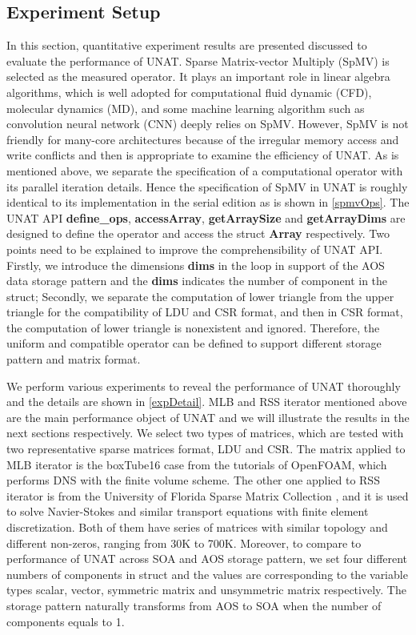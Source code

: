 \documentclass[conference]{IEEEtran}
\begin{document}
\subsection{Experiment Setup}
In this section, quantitative experiment results are presented discussed to evaluate the performance of UNAT. Sparse Matrix-vector Multiply (SpMV) is selected as the measured operator. It plays an important role in linear algebra algorithms, which is well adopted for computational fluid dynamic (CFD), molecular dynamics (MD), and some machine learning algorithm such as convolution neural network (CNN) deeply relies on SpMV. However, SpMV is not friendly for many-core architectures because of the irregular memory access and write conflicts \cite{b8} and then is appropriate to examine the efficiency of UNAT. As is mentioned above, we separate the specification of a computational operator with its parallel iteration details. Hence the specification of SpMV in UNAT is roughly identical to its implementation in the serial edition as is shown in \ref{spmvOps}. The UNAT API \textbf{define\_ops}, \textbf{accessArray}, \textbf{getArraySize} and \textbf{getArrayDims} are designed to define the operator and access the struct \textbf{Array} respectively. Two points need to be explained to improve the comprehensibility of UNAT API. Firstly, we introduce the dimensions \textbf{dims} in the loop in support of the AOS data storage pattern and the \textbf{dims} indicates the number of component in the struct; Secondly, we separate the computation of lower triangle from the upper triangle for the compatibility of LDU and CSR format, and then in CSR format, the computation of lower triangle is nonexistent and ignored. Therefore, the uniform and compatible operator can be defined to support different storage pattern and matrix format.

We perform various experiments to reveal the performance of UNAT thoroughly and the details are shown in \ref{expDetail}. MLB and RSS iterator mentioned above are the main performance object of UNAT and we will illustrate the results in the next sections respectively. We select two types of matrices, which are tested with two representative sparse matrices format, LDU and CSR. The matrix applied to MLB iterator is the boxTube16 case from the tutorials of OpenFOAM, which performs DNS with the finite volume scheme. The other one applied to RSS iterator is from the University of Florida Sparse Matrix Collection \cite{b9}, and it is used to solve Navier-Stokes and similar transport equations with finite element discretization. Both of them have series of matrices with similar topology and different non-zeros, ranging from 30K to 700K. Moreover, to compare to performance of UNAT across SOA and AOS storage pattern, we set four different numbers of components in struct and the values are corresponding to the variable types scalar, vector, symmetric matrix and unsymmetric matrix respectively. The storage pattern naturally transforms from AOS to SOA when the number of components equals to 1.
\end{document}
